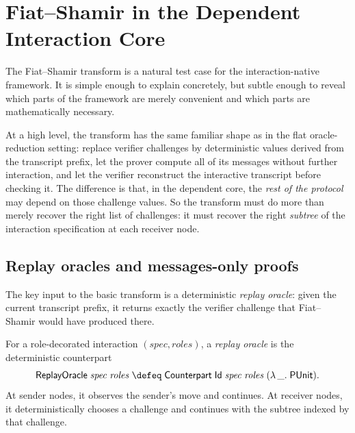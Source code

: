 
\section{Fiat--Shamir in the Dependent Interaction Core}\label{sec:interaction-fiat-shamir}

The Fiat--Shamir transform is a natural test case for the interaction-native
framework.  It is simple enough to explain concretely, but subtle enough to
reveal which parts of the framework are merely convenient and which parts are
mathematically necessary.

At a high level, the transform has the same familiar shape as in the flat
oracle-reduction setting: replace verifier challenges by deterministic values
derived from the transcript prefix, let the prover compute all of its messages
without further interaction, and let the verifier reconstruct the interactive
transcript before checking it.  The difference is that, in the dependent core,
the \emph{rest of the protocol} may depend on those challenge values.  So the
transform must do more than merely recover the right list of challenges: it
must recover the right \emph{subtree} of the interaction specification at each
receiver node.

\subsection{Replay oracles and messages-only proofs}

The key input to the basic transform is a deterministic \emph{replay oracle}:
given the current transcript prefix, it returns exactly the verifier challenge
that Fiat--Shamir would have produced there.

\begin{definition}[ReplayOracle]
  \label{int:replay-oracle}
  For a role-decorated interaction $(\mathit{spec}, \mathit{roles})$, a
  \emph{replay oracle} is the deterministic counterpart
  \[
    \mathsf{ReplayOracle}\;\mathit{spec}\;\mathit{roles}
    \;\defeq\;
    \mathsf{Counterpart}\;\mathsf{Id}\;\mathit{spec}\;\mathit{roles}\;
      (\lambda\,\_.\;\mathsf{PUnit}).
  \]
  At sender nodes, it observes the sender's move and continues.  At receiver
  nodes, it deterministically chooses a challenge and continues with the
  subtree indexed by that challenge.
\end{definition}

